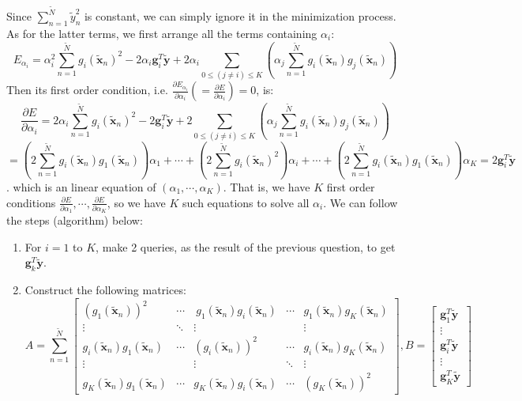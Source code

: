 \documentclass[11pt]{article}
\begin{document}
\begin{enumerate}[label=\textbf{\arabic*}.]
    Since $\sum_{n=1}^{\tilde{N}} \tilde{y}_n^2$ is constant, we can simply ignore it in the minimization process. As for the latter terms, we first arrange all the terms containing $\alpha_i$:
    \[E_{\alpha_i} = \alpha_i^2 \sum_{n=1}^{\tilde{N}}g_i(\mathbf{\tilde{x}}_n)^2 - 2\alpha_i \mathbf{g}_i^T\mathbf{\tilde{y}} + 2\alpha_i \sum_{0 \leq (j \neq i) \leq K}\left(\alpha_j \sum_{n=1}^{\tilde{N}} g_i (\mathbf{\tilde{x}}_n) g_j (\mathbf{\tilde{x}}_n) \right)\]
    Then its first order condition, i.e. $\frac{\partial E_{\alpha_i}}{\partial \alpha_i} (= \frac{\partial E}{\partial \alpha_i}) = 0$, is: 
    \[\frac{\partial E}{\partial \alpha_i} = 2\alpha_i \sum_{n=1}^{\tilde{N}}g_i(\mathbf{\tilde{x}}_n)^2 - 2 \mathbf{g}_i^T\mathbf{\tilde{y}} + 2 \sum_{0 \leq (j \neq i) \leq K}\left(\alpha_j \sum_{n=1}^{\tilde{N}} g_i (\mathbf{\tilde{x}}_n) g_j (\mathbf{\tilde{x}}_n) \right)\]
    \[= \left(2\sum_{n=1}^{\tilde{N}} g_i (\mathbf{\tilde{x}}_n) g_1 (\mathbf{\tilde{x}}_n) \right)\alpha_1 + \cdots + \left(2\sum_{n=1}^{\tilde{N}}g_i(\mathbf{\tilde{x}}_n)^2\right)\alpha_i + \cdots + \left(2\sum_{n=1}^{\tilde{N}} g_i (\mathbf{\tilde{x}}_n) g_1 (\mathbf{\tilde{x}}_n) \right)\alpha_K = 2 \mathbf{g}_i^T\mathbf{\tilde{y}} \]
    . which is an linear equation of $(\alpha_1, \cdots, \alpha_K)$. That is, we have $K$ first order conditions $\frac{\partial E}{\partial \alpha_1}, \cdots, \frac{\partial E}{\partial \alpha_K}$, so we have $K$ such equations to solve all $\alpha_i$. We can follow the steps (algorithm) below:
    \begin{enumerate}
      \item For $i=1$ to $K$, make 2 queries, as the result of the previous question, to get $\mathbf{g}_k^T \mathbf{\tilde{y}}$.
      \item Construct the following matrices:
      \[A = \sum_{n=1}^{\tilde{N}} \left[ \begin{array}{ccccc} (g_1(\mathbf{\tilde{x}}_n))^2 & \cdots & \ g_1 (\mathbf{\tilde{x}}_n) g_i (\mathbf{\tilde{x}}_n)  & \cdots &  g_1 (\mathbf{\tilde{x}}_n) g_K (\mathbf{\tilde{x}}_n)  \\
      \vdots & \ddots & \vdots & & \vdots \\
       g_i (\mathbf{\tilde{x}}_n) g_1 (\mathbf{\tilde{x}}_n)  & \cdots & (g_i(\mathbf{\tilde{x}}_n))^2 & \cdots &  g_i (\mathbf{\tilde{x}}_n) g_K (\mathbf{\tilde{x}}_n) \\
       \vdots & & \vdots & \ddots & \vdots \\
        g_K (\mathbf{\tilde{x}}_n) g_1 (\mathbf{\tilde{x}}_n) & \cdots &  g_K (\mathbf{\tilde{x}}_n) g_i (\mathbf{\tilde{x}}_n) & \cdots & (g_K(\mathbf{\tilde{x}}_n))^2 \end{array} \right], B = \left[\begin{array}{c} \mathbf{g}_1^T\mathbf{\tilde{y}}\\ \vdots \\ \mathbf{g}_i^T\mathbf{\tilde{y}} \\ \vdots \\  \mathbf{g}_K^T\mathbf{\tilde{y}}\end{array}\right]\]


\end{enumerate}
\end{enumerate}
\end{document}
